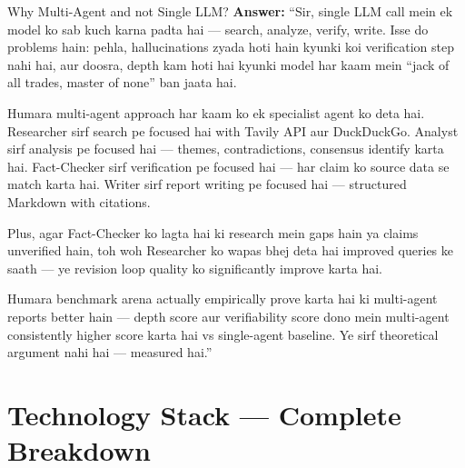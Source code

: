 \documentclass[11pt,a4paper,twoside]{report}
\begin{document}
\begin{interviewbox}{Why Multi-Agent and not Single LLM?}
\textbf{Answer:} ``Sir, single LLM call mein ek model ko sab kuch karna padta hai --- search, analyze, verify, write. Isse do problems hain: pehla, hallucinations zyada hoti hain kyunki koi verification step nahi hai, aur doosra, depth kam hoti hai kyunki model har kaam mein ``jack of all trades, master of none'' ban jaata hai.

Humara multi-agent approach har kaam ko ek specialist agent ko deta hai. Researcher sirf search pe focused hai with Tavily API aur DuckDuckGo. Analyst sirf analysis pe focused hai --- themes, contradictions, consensus identify karta hai. Fact-Checker sirf verification pe focused hai --- har claim ko source data se match karta hai. Writer sirf report writing pe focused hai --- structured Markdown with citations.

Plus, agar Fact-Checker ko lagta hai ki research mein gaps hain ya claims unverified hain, toh woh Researcher ko wapas bhej deta hai improved queries ke saath --- ye revision loop quality ko significantly improve karta hai.

Humara benchmark arena actually empirically prove karta hai ki multi-agent reports better hain --- depth score aur verifiability score dono mein multi-agent consistently higher score karta hai vs single-agent baseline. Ye sirf theoretical argument nahi hai --- measured hai.''
\end{interviewbox}

\section{Technology Stack --- Complete Breakdown}
\end{document}
